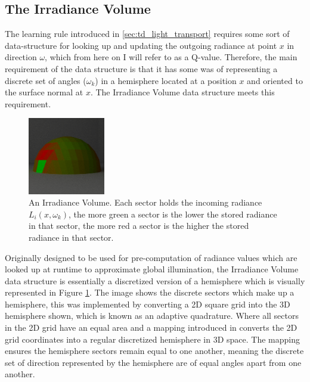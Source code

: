 \documentclass[ %
                    author={Callum Pearce},
                supervisor={Dr. Neill Campbell},
                    degree={MEng},
                     title={How effective are Temporal difference learning methods for reducing the number of zero contribution light paths, while still accurately approximating Global Illumination in Path tracing?},
                  subtitle={},
                      type={research},
                      year={2019} ]{dissertation}
\begin{document}
\subsection{The Irradiance Volume}
The learning rule introduced in \ref{sec:td_light_transport} requires some sort of data-structure for looking up and updating the outgoing radiance at point $x$ in direction $\omega$, which from here on I will refer to as a Q-value. Therefore, the main requirement of the data structure is that it has some was of representing a discrete set of angles ($\omega_k$) in a hemisphere located at a position $x$ and oriented to the surface normal at $x$. The Irradiance Volume data structure \cite{greger1998irradiance} meets this requirement.\\

\begin{figure}[h]
\begin{center}
\includegraphics[width=0.3\textwidth]{images/renders/hemispheres/irradiance_volume.png}    
\end{center}
\caption{An Irradiance Volume. Each sector holds the incoming radiance $L_i(x,\omega_k)$, the more green a sector is the lower the stored radiance in that sector, the more red a sector is the higher the stored radiance in that sector. }
\label{fig:irradiance_volume}
\end{figure}

Originally designed to be used for pre-computation of radiance values which are looked up at runtime to approximate global illumination, the Irradiance Volume data structure is essentially a discretized version of a hemisphere which is visually represented in Figure \ref{fig:irradiance_volume}. The image shows the discrete sectors which make up a hemisphere, this was implemented by converting a 2D square grid into the 3D hemisphere shown, which is known as an adaptive quadrature. Where all sectors in the 2D grid have an equal area and a mapping introduced in \cite{shirley1994notes} converts the 2D grid coordinates into a regular discretized hemisphere in 3D space. The mapping ensures the hemisphere sectors remain equal to one another, meaning the discrete set of direction represented by the hemisphere are of equal angles apart from one another.\\
\end{document}
